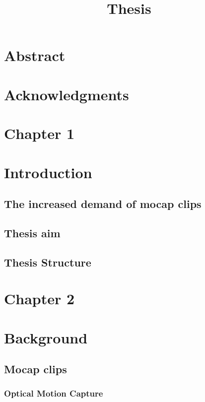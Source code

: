 \documentclass[12pt,oneside,a4paper,english]{article}
\title{Thesis} %
\begin{document}


\newpage
\doublespacing
\renewcommand{\baselinestretch}{1}\normalsize
\tableofcontents
\renewcommand{\baselinestretch}{1}\normalsize
\singlespacing
\thispagestyle{fancy} %


\newpage
{} 
\newpage
\section*{Abstract}
\newpage
\section*{Acknowledgments}
\newpage
\section*{Chapter 1 \\}
\section{Introduction}
\subsection{The increased demand of mocap clips}
 
\subsection{Thesis aim}
 
\subsection{Thesis Structure}
 

\newpage
\section*{Chapter 2 \\}
\section{Background}
\subsection{Mocap clips}
 
\pagebreak
\subsubsection{Optical Motion Capture}
 
\pagebreak
\end{document}
